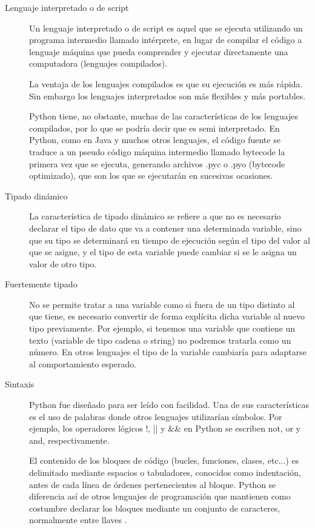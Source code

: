  \begin{description}
     \item[Lenguaje interpretado o de script] Un lenguaje interpretado o de script es aquel que se ejecuta utilizando un programa intermedio llamado intérprete, en lugar de compilar el código a lenguaje máquina que pueda comprender y ejecutar directamente una computadora (lenguajes compilados).
     
     La ventaja de los lenguajes compilados es que su ejecución es más rápida. Sin embargo los lenguajes interpretados son más flexibles y más portables.
     
     Python tiene, no obstante, muchas de las características de los lenguajes compilados, por lo que se podría decir que es semi interpretado. En Python, como en Java y muchos otros lenguajes, el código fuente se traduce a un pseudo código máquina intermedio llamado bytecode la primera vez que se ejecuta, generando archivos .pyc o .pyo (bytecode optimizado), que son los que se ejecutarán en sucesivas ocasiones.
     
     \item[Tipado dinámico] La característica de tipado dinámico se refiere a que no es necesario declarar el tipo de dato que va a contener una determinada variable, sino que su tipo se determinará en tiempo de ejecución según el tipo del valor al que se asigne, y el tipo de esta variable puede cambiar si se le asigna un valor de otro tipo.
     
     \item[ Fuertemente tipado] No se permite tratar a una variable como si fuera de un tipo distinto al que tiene, es necesario convertir de forma explícita dicha variable al nuevo tipo previamente. Por ejemplo, si tenemos una variable que contiene un texto (variable de tipo cadena o string) no podremos tratarla como un número. En otros lenguajes el tipo de la variable cambiaría para adaptarse al comportamiento esperado.
     
     \item[Sintaxis] Python fue diseñado para ser leído con facilidad. Una de sus características es el uso de palabras donde otros lenguajes utilizarían símbolos. Por ejemplo, los operadores lógicos !, || y \&\& en Python se escriben not, or y and, respectivamente.
     
     El contenido de los bloques de código (bucles, funciones, clases, etc...) es delimitado mediante espacios o tabuladores, conocidos como indentación, antes de cada línea de órdenes pertenecientes al bloque. Python se diferencia así de otros lenguajes de programación que mantienen como costumbre declarar los bloques mediante un conjunto de caracteres, normalmente entre llaves {}.
     

\end{description}
